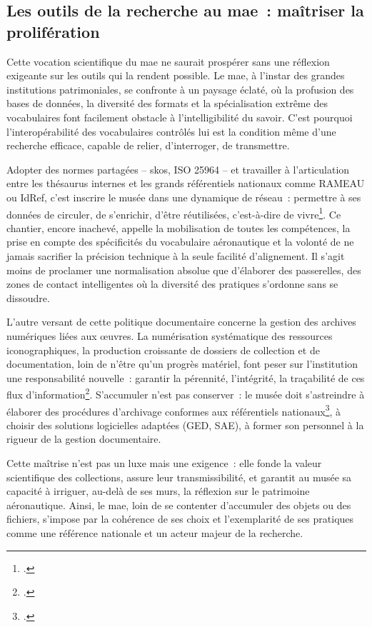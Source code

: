 \subsection{Les outils de la recherche au \ac{mae} : maîtriser la prolifération}

Cette vocation scientifique du \ac{mae} ne saurait prospérer sans une réflexion exigeante sur les outils qui la rendent possible. Le \ac{mae}, à l’instar des grandes institutions patrimoniales, se confronte à un paysage éclaté, où la profusion des bases de données, la diversité des formats et la spécialisation extrême des vocabulaires font facilement obstacle à l’intelligibilité du savoir. C’est pourquoi l’interopérabilité des vocabulaires contrôlés lui est la condition même d’une recherche efficace, capable de relier, d’interroger, de transmettre.

Adopter des normes partagées – \ac{skos}, ISO 25964 – et travailler à l’articulation entre les thésaurus internes et les grands référentiels nationaux comme RAMEAU ou IdRef, c’est inscrire le musée dans une dynamique de réseau : permettre à ses données de circuler, de s’enrichir, d’être réutilisées, c’est-à-dire de vivre\footcite{hudonISO25964Pour2012a,chichereau_normes_2007,nouvel_thesaurus_2019}. Ce chantier, encore inachevé, appelle la mobilisation de toutes les compétences, la prise en compte des spécificités du vocabulaire aéronautique et la volonté de ne jamais sacrifier la précision technique à la seule facilité d’alignement. Il s’agit moins de proclamer une normalisation absolue que d’élaborer des passerelles, des zones de contact intelligentes où la diversité des pratiques s’ordonne sans se dissoudre.

L’autre versant de cette politique documentaire concerne la gestion des archives numériques liées aux œuvres. La numérisation systématique des ressources iconographiques, la production croissante de dossiers de collection et de documentation, loin de n’être qu’un progrès matériel, font peser sur l’institution une responsabilité nouvelle : garantir la pérennité, l’intégrité, la traçabilité de ces flux d’information\footcite{ministere_de_la_culture_documenter_2020,bechard_archives_2020}. S’accumuler n’est pas conserver : le musée doit s’astreindre à élaborer des procédures d’archivage conformes aux référentiels nationaux\footcite{comite_interministeriel_aux_archives_de_france_referentiel_nodate}, à choisir des solutions logicielles adaptées (GED, SAE), à former son personnel à la rigueur de la gestion documentaire.

Cette maîtrise n’est pas un luxe mais une exigence : elle fonde la valeur scientifique des collections, assure leur transmissibilité, et garantit au musée sa capacité à irriguer, au-delà de ses murs, la réflexion sur le patrimoine aéronautique. Ainsi, le \ac{mae}, loin de se contenter d’accumuler des objets ou des fichiers, s’impose par la cohérence de ses choix et l’exemplarité de ses pratiques comme une référence nationale et un acteur majeur de la recherche.
